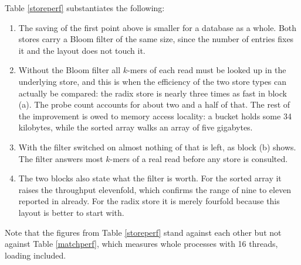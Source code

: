 \documentclass[pdflatex,sn-vancouver-num]{sn-jnl}
\begin{document}
    Table \ref{storeperf} substantiates the following:

\begin{enumerate}
	\item The saving of the first point above is smaller for a database as a whole. Both stores carry a Bloom filter of the same size, since the number of entries fixes it and the layout does not touch it.

	\item Without the Bloom filter all $k$-mers of each read must be looked up in the underlying store, and this is when the efficiency of the two store types can actually be compared: the radix store is nearly three times as fast in block (a). The probe count accounts for about two and a half of that. The rest of the improvement is owed to memory access locality: a bucket holds some 34 kilobytes, while the sorted array walks an array of five gigabytes.

	\item With the filter switched on almost nothing of that is left, as block (b) shows. The filter answers most $k$-mers of a real read before any store is consulted.

	\item The two blocks also state what the filter is worth. For the sorted array it raises the throughput elevenfold, which confirms the range of nine to eleven reported in \citep{genestrip-pub} already. For the radix store it is merely fourfold because this layout is better to start with.
\end{enumerate}

    Note that the figures from Table \ref{storeperf} stand against each other but not against Table \ref{matchperf}, which measures whole processes with \num{16} threads, loading included.





\end{document}

